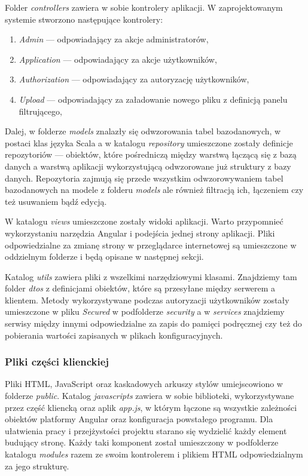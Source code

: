 \documentclass[a4paper,12pt,twoside]{article}
\begin{document}
Folder \textit{controllers} zawiera w sobie kontrolery aplikacji.
W zaprojektowanym systemie stworzono następujące kontrolery:
\begin{enumerate}[1)]
\item \textit{Admin} — odpowiadający za akcje administratorów,
\item \textit{Application} — odpowiadający za akcje użytkowników,
\item \textit{Authorization} — odpowiadający za autoryzację użytkowników,
\item \textit{Upload} — odpowiadający za załadowanie nowego pliku z definicją panelu filtrującego,
\end{enumerate}

Dalej, w folderze \textit{models} znalazły się odwzorowania tabel bazodanowych,
w postaci klas języka Scala a w katalogu \textit{repository} umieszczone
zostały definicje repozytoriów — obiektów, które pośredniczą
między warstwą łączącą się z bazą danych a warstwą aplikacji
wykorzystującą odwzorowane już struktury z bazy danych.
Repozytoria zajmują się przede wszystkim odwzorowywaniem tabel bazodanowych na
modele z folderu \textit{models} ale również filtracją ich, łączeniem
czy też usuwaniem bądź edycją.

W katalogu \textit{views} umieszczone zostały widoki aplikacji.
Warto przypomnieć wykorzystaniu narzędzia Angular
i podejścia jednej strony aplikacji. Pliki odpowiedzialne
za zmianę strony w przeglądarce internetowej są umieszczone
w oddzielnym folderze i będą opisane w następnej sekcji.

Katalog \textit{utils} zawiera pliki z wszelkimi narzędziowymi
klasami. Znajdziemy tam folder \textit{dtos} z definicjami obiektów,
które są przesyłane między serwerem a klientem.
Metody wykorzystywane podczas autoryzacji użytkowników zostały umieszczone w pliku \textit{Secured} w podfolderze \textit{security} a w \textit{services} znajdziemy
serwisy między innymi odpowiedzialne za zapis do pamięci podręcznej czy też
do pobierania wartości zapisanych w plikach konfiguracyjnych.

\newpage
\subsubsection{Pliki części klienckiej}

Pliki HTML, JavaScript oraz kaskadowych arkuszy stylów umiejscowiono
w folderze \textit{public}.
Katalog \textit{javascripts} zawiera w sobie biblioteki, wykorzystywane przez
część kliencką oraz aplik \textit{app.js}, w którym łączone są wszystkie
zależności obiektów platformy Angular oraz konfiguracja powstałego programu.
Dla ułatwienia pracy i przejżystości projektu starano się wydzielić każdy element budujący stronę. Każdy taki komponent został umieszczony w podfolderze
katalogu \textit{modules} razem ze swoim kontrolerem i plikiem HTML odpowiedzialnym
za jego strukturę.
\end{document}

